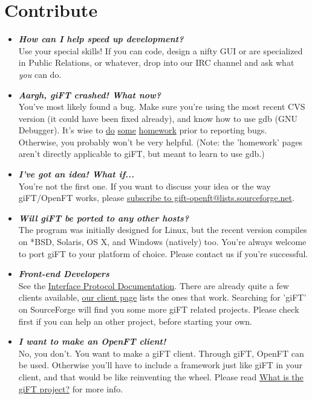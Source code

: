\documentclass[10pt]{article}
\newcommand{\question}[1]{\item\textbf{\emph{#1}}}
\begin{document}
\section{Contribute}
\begin{itemize}

\question {How can I help speed up development?}\\
Use your special skills! If you can code, design a nifty GUI or
are specialized in Public Relations, or whatever, drop into our
IRC channel and ask what \emph{you} can do.

\question {Aargh, giFT crashed! What now?}\\
You've most likely found a bug. Make sure you're using the most
recent CVS version (it could have been fixed already), and know
how to use gdb (GNU Debugger). It's wise to
\href{http://wand.cs.waikato.ac.nz/~dhtrl1/pl5/gdb.html}{do}
\href{http://web.mit.edu/sipb-iap/unixsoftdev/www/gdb.html}{some} 
\href{http://bugs.php.net/bugs-generating-backtrace.php}{homework} 
prior to reporting bugs. Otherwise, you probably won't be very
helpful. (Note: the 'homework' pages aren't directly applicable to
giFT, but meant to learn to use gdb.)

\question {I've got an idea! What if...}\\
You're not the first one. If you want to discuss your idea or the
way giFT/OpenFT works, please
\href{http://lists.sourceforge.net/lists/listinfo/gift-openft}{subscribe
to gift-openft@lists.sourceforge.net}.
 
\question {Will giFT be ported to any other hosts?}\\
The program was initially designed for Linux, but the recent
version compiles on *BSD, Solaris, OS X, and Windows (natively)
too. You're always welcome to port giFT to your platform of
choice. Please contact us if you're successful. 
 
\question {Front-end Developers}\\
See the
\href{http://gift.sourceforge.net/docs/?document=interface.html}{Interface
Protocol Documentation}. There are already quite a few clients
available, \href{http://gift.sourceforge.net/dev/clients.php}{our
client page} lists the ones that work. Searching for 'giFT' on
SourceForge will find you some more giFT related projects. Please
check first if you can help an other project, before starting your
own.

\question {I want to make an OpenFT client!}\\
No, you don't. You want to make a giFT client. Through giFT,
OpenFT can be used. Otherwise you'll have to include a framework
just like giFT in your client, and that would be like reinventing
the wheel. Please read
\href{http://gift.sourceforge.net/docs/?document=whatis.html}{What
is the giFT project?} for more info.

\end{itemize}
 
\end{document}
